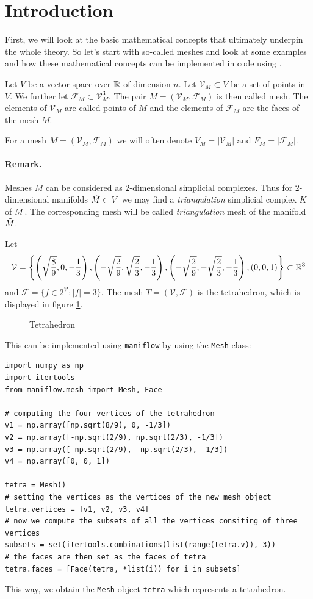 \section{Introduction}
First, we will look at the basic mathematical concepts that ultimately underpin the whole theory. So let's start with so-called meshes and look at some examples and how these mathematical concepts can be implemented in code using \maniflow{}.
\begin{defi}[Mesh]
    Let $V$ be a vector space  over $\mathbb{R}$ of dimension $n$. Let $\mathcal{V}_M\subset V$ be a set of points in $V$. We further let $\mathcal{F}_M\subset\mathcal{V}_M^3$. The pair $M = (\mathcal{V}_M, \mathcal{F}_M)$ is then called mesh. The elements of $\mathcal{V}_M$ are called points of $M$ and the elements of $\mathcal{F}_M$ are the faces of the mesh $M$.
\end{defi}
For a mesh $M = (\mathcal{V}_M, \mathcal{F}_M)$ we will often denote $V_M = \vert\mathcal{V}_M\vert$ and $F_M = \vert\mathcal{F}_M\vert$.
\paragraph{Remark.} Meshes $M$ can be considered as $2$-dimensional simplicial complexes. Thus for $2$-dimensional manifolds $\Tilde{M}\subset V$ we may find a \textit{triangulation} simplicial complex $K$ of $\Tilde{M}$. The corresponding mesh will be called \textit{triangulation} mesh of the manifold $\Tilde{M}$.
\begin{ex}[Tetrahedron] Let 
\begin{align*}
    \mathcal{V} = \left\{\left(\sqrt{\frac89},0,-\frac13\right),\left(-\sqrt{\frac29},\sqrt{\frac23},-\frac13\right),\left(-\sqrt{\frac29},-\sqrt{\frac23},-\frac13\right), \left(0,0,1\right)\right\}\subset\mathbb{R}^3
\end{align*}
and $\mathcal{F} = \{f\in2^{\mathcal{V}}:\vert f\vert = 3\}$. The mesh $T = (\mathcal{V},\mathcal{F})$ is the tetrahedron, which is displayed in figure \ref{fig:tetra}.
    \begin{figure}[h]
        \centering
        
        \caption{Tetrahedron}
        \label{fig:tetra}
    \end{figure}
This can be implemented using \texttt{maniflow} by using the \texttt{Mesh} class:
\begin{lstlisting}
import numpy as np
import itertools
from maniflow.mesh import Mesh, Face

# computing the four vertices of the tetrahedron
v1 = np.array([np.sqrt(8/9), 0, -1/3])
v2 = np.array([-np.sqrt(2/9), np.sqrt(2/3), -1/3])
v3 = np.array([-np.sqrt(2/9), -np.sqrt(2/3), -1/3])
v4 = np.array([0, 0, 1])

tetra = Mesh()
# setting the vertices as the vertices of the new mesh object
tetra.vertices = [v1, v2, v3, v4]
# now we compute the subsets of all the vertices consiting of three vertices
subsets = set(itertools.combinations(list(range(tetra.v)), 3))
# the faces are then set as the faces of tetra
tetra.faces = [Face(tetra, *list(i)) for i in subsets]
\end{lstlisting}
This way, we obtain the \texttt{Mesh} object \texttt{tetra} which represents a tetrahedron.
\end{ex}
